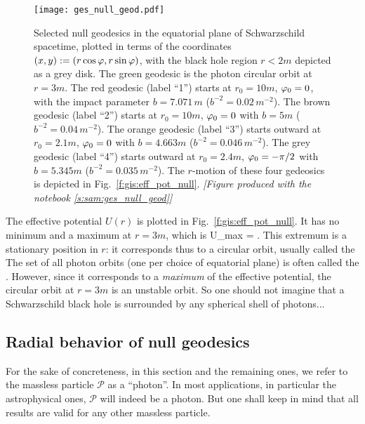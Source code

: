 \begin{figure}
\centerline{\texttt{[image: ges\_null\_geod.pdf]}}
\caption[]{\label{f:gis:null_geod} \footnotesize
Selected null geodesics in the equatorial plane of Schwarzschild spacetime,
plotted in terms
of the coordinates $(x,y) := (r\cos\varphi, r\sin\varphi)$, with the black hole
region $r<2m$ depicted as a grey disk.
The green geodesic is the photon circular orbit at $r=3m$.
The red geodesic (label ``1'') starts at $r_0=10 m$, $\varphi_0=0$, with
the impact parameter $b = 7.071 \, m$ ($b^{-2} = 0.02\, m^{-2}$).
The brown geodesic (label ``2'') starts at $r_0=10 m$, $\varphi_0=0$ with $b = 5 m$ ($b^{-2} = 0.04\, m^{-2}$).
The orange geodesic (label ``3'') starts outward at $r_0=2.1 m$, $\varphi_0=0$ with $b = 4.663 m$ ($b^{-2} = 0.046\, m^{-2}$).
The grey geodesic (label ``4'') starts outward at $r_0=2.4 m$, $\varphi_0=-\pi/2$ with $b = 5.345 m$ ($b^{-2} = 0.035\, m^{-2}$).
The $r$-motion of these four gedeosics is depicted in
Fig.~\ref{f:gis:eff_pot_null}. \textsl{[Figure produced with the notebook \ref{s:sam:ges_null_geod}]}}
\end{figure}

The effective potential $U(r)$ is plotted in Fig.~\ref{f:gis:eff_pot_null}.
It has no minimum and a maximum at $r=3m$, which is
\be \label{e:ges:U_max}
    U_{\rm max} =  .
\ee
This extremum is a stationary position in $r$: it corresponds thus to a circular
orbit, usually called the
The set of all photon orbits (one per choice of equatorial plane) is often
called the .
However, since it corresponds to a \emph{maximum} of the effective potential, the circular
orbit at $r=3m$ is an unstable orbit. So one should not imagine that a
Schwarzschild black hole is surrounded by any spherical shell of photons...


\subsection{Radial behavior of null geodesics} \label{s:gis:null_radial_behav}

For the sake of concreteness, in this section and the remaining ones, we
refer to the massless particle $\mathscr{P}$ as a ``photon''. In most applications, in
particular the astrophysical ones, $\mathscr{P}$ will indeed be a photon.
But one shall keep in mind that all results are valid for any other massless
particle.

